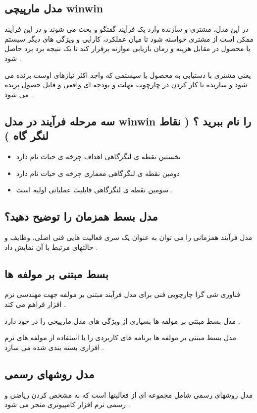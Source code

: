 \documentclass{article}
\begin{document}
\newpage

\subsection{مدل مارپیچی winwin}

در این مدل، مشتری و سازنده وارد یک فرآیند گفتگو و بحث می شوند و در این فرآیند ممکن است از مشتری خواسته شود تا میان عملکرد، کارایی و ویژگی های دیگر سیستم یا محصول در مقابل هزینه و زمان بازیابی موازنه برقرار کند تا  یک نتیجه برد برد حاصل شود .

یعنی مشتری با دستیابی به محصول یا سیستمی که واجد اکثر نیازهای اوست برنده می شود و سازنده با کار کردن در چارچوب مهلت و بودجه ای واقعی و قابل حصول برنده می شود .


\subsection{سه مرحله فرآیند در مدل winwin را نام ببرید ؟ 
( نقاط لنگر گاه )
}


\begin{itemize}
	\item نخستین نقطه ی لنگرگاهی اهداف چرخه ی حیات نام دارد
	\item دومین نقطه ی لنگرگاهی معماری چرخه ی حیات نام دارد
	\item سومین نقطه ی لنگرگاهی قابلیت عملیاتی اولیه است .
\end{itemize}


\subsection{مدل بسط همزمان را توضیح دهید؟}
مدل فرآیند همزمانی را می توان به عنوان یک سری فعالیت هایی فنی اصلی، وظایف و حالتهای مرتبط با آن نمایش داد .



\subsection{بسط مبتنی بر مولفه ها}
فناوری شی گرا چارچوبی فنی برای مدل فرآیند مبتنی بر مولفه جهت مهندسی نرم افزار فراهم می کند .

مدل بسط مبتنی بر مولفه ها بسیاری از ویژگی های مدل مارپیچی را در خود دارد .

مدل بسط مبتنی بر مولفه ها برنامه های کاربردی را با استفاده از مولفه های نرم افزاری بسته بندی شده می سازد .


\subsection{مدل روشهای رسمی}
مدل روشهای رسمی شامل مجموعه ای از فعالیتها است که به مشخص کردن ریاضی و رسمی نرم افزار  کامپیوتری منجر می شود .
\end{document}
